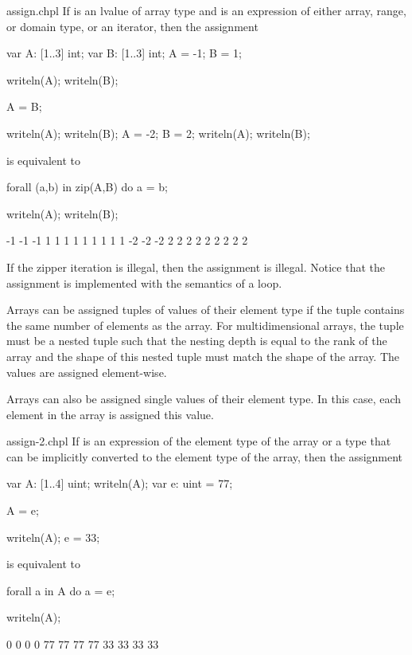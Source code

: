 \begin{chapelexample}{assign.chpl}
If  is an lvalue of array type and  is an expression
of either array, range, or domain type, or an iterator, then the
assignment
\begin{chapelpre}
var A: [1..3] int;
var B: [1..3] int;
A = -1;
B = 1;
\end{chapelpre}
\begin{chapelnoprint}
writeln(A);
writeln(B);
\end{chapelnoprint}
\begin{chapel}
A = B;
\end{chapel}
\begin{chapelnoprint}
writeln(A);
writeln(B);
A = -2;
B = 2;
writeln(A);
writeln(B);
\end{chapelnoprint}
is equivalent to
\begin{chapel}
forall (a,b) in zip(A,B) do
  a = b;
\end{chapel}
\begin{chapelpost}
writeln(A);
writeln(B);
\end{chapelpost}
\begin{chapeloutput}
-1 -1 -1
1 1 1
1 1 1
1 1 1
-2 -2 -2
2 2 2
2 2 2
2 2 2
\end{chapeloutput}
If the zipper iteration is illegal, then the assignment is illegal.
Notice that the assignment is implemented with the semantics of
a  loop.
\end{chapelexample}

Arrays can be assigned tuples of values of their element type if the
tuple contains the same number of elements as the array.  For
multidimensional arrays, the tuple must be a nested tuple such that
the nesting depth is equal to the rank of the array and the shape of
this nested tuple must match the shape of the array.  The values are
assigned element-wise.


Arrays can also be assigned single values of their element type.  In
this case, each element in the array is assigned this value.
\begin{chapelexample}{assign-2.chpl}
If  is an expression of the element type of the array or a
type that can be implicitly converted to the element type of the
array, then the assignment
\begin{chapelpre}
var A: [1..4] uint;
writeln(A);
var e: uint = 77;
\end{chapelpre}
\begin{chapel}
A = e;
\end{chapel}
\begin{chapelnoprint}
writeln(A);
e = 33;
\end{chapelnoprint}
is equivalent to
\begin{chapel}
forall a in A do
  a = e;
\end{chapel}
\begin{chapelpost}
writeln(A);
\end{chapelpost}
\begin{chapeloutput}
0 0 0 0
77 77 77 77
33 33 33 33
\end{chapeloutput}
\end{chapelexample}


